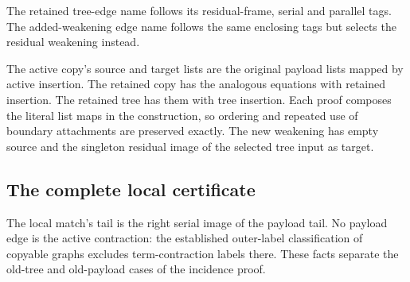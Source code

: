 

The retained tree-edge name follows its residual-frame, serial and parallel
tags. The added-weakening edge name follows the same enclosing tags but selects
the residual weakening instead.



The active copy's source and target lists are the original payload lists
mapped by active insertion. The retained copy has the analogous equations
with retained insertion. The retained tree has them with tree insertion.
Each proof composes the literal list maps in the construction, so ordering
and repeated use of boundary attachments are preserved exactly. The new
weakening has empty source and the singleton residual image of the selected
tree input as target.









\subsection{The complete local certificate}

The local match's tail is the right serial image of the payload tail. No
payload edge is the active contraction: the established outer-label
classification of copyable graphs excludes term-contraction labels there.
These facts separate the old-tree and old-payload cases of the incidence proof.

